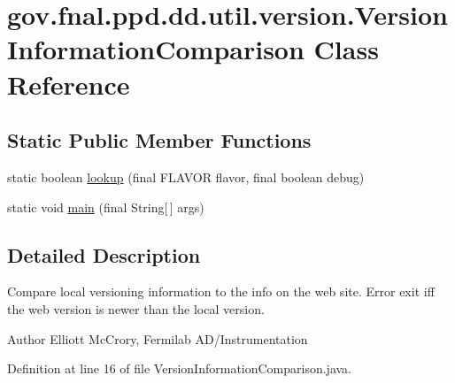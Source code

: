 \hypertarget{classgov_1_1fnal_1_1ppd_1_1dd_1_1util_1_1version_1_1VersionInformationComparison}{\section{gov.\-fnal.\-ppd.\-dd.\-util.\-version.\-Version\-Information\-Comparison Class Reference}
\label{classgov_1_1fnal_1_1ppd_1_1dd_1_1util_1_1version_1_1VersionInformationComparison}
}
\subsection*{Static Public Member Functions}
\begin{DoxyCompactItemize}
\item 
static boolean \hyperlink{classgov_1_1fnal_1_1ppd_1_1dd_1_1util_1_1version_1_1VersionInformationComparison_af1c5f9dd0b50c3fea2a6d7bb08992abb}{lookup} (final F\-L\-A\-V\-O\-R flavor, final boolean debug)
\item 
static void \hyperlink{classgov_1_1fnal_1_1ppd_1_1dd_1_1util_1_1version_1_1VersionInformationComparison_a34491a10aba931aef023f65cc0a63d00}{main} (final String\mbox{[}$\,$\mbox{]} args)
\end{DoxyCompactItemize}


\subsection{Detailed Description}
Compare local versioning information to the info on the web site. Error exit iff the web version is newer than the local version.

\begin{DoxyAuthor}{Author}
Elliott Mc\-Crory, Fermilab A\-D/\-Instrumentation 
\end{DoxyAuthor}


Definition at line 16 of file Version\-Information\-Comparison.\-java.



